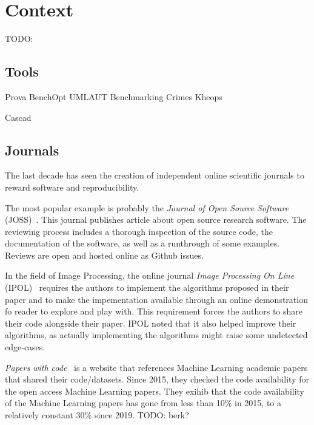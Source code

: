 \documentclass[sigconf,natbib=false]{acmart}
\newcommand{\todo}[1]{{\color{red}TODO: #1}}
\begin{document}
%
\section{Context}

\todo{}

\subsection{Tools}

Prova \cite{guerrera2019reproducible}
BenchOpt \cite{moreau2022benchopt}
UMLAUT \cite{umlaut}
Benchmarking Crimes \cite{van2018benchmarking}
Kheops \cite{rosendo2023kheops}

Cascad \cite{perignon2019certify}

\subsection{Journals}



The last decade has seen the creation of independent online scientific journals to reward software and reproducibility.

The most popular example is probably the \emph{Journal of Open Source Software} (JOSS)\ \cite{smith2018journal}.
This journal publishes article about open source research software.
The reviewing process includes a thorough inspection of the source code, the documentation of the software, as well as a runthrough of some examples.
Reviews are open and hosted online as Github issues.

In the field of Image Processing, the online journal \emph{Image Processing On Line} (IPOL)\ \cite{colom2015ipol} requires the authors to implement the algorithms proposed in their paper and to make the impementation available through an online demonstration fo reader to explore and play with.
This requirement forces the authors to share their code alongside their paper.
IPOL noted that it also helped improve their algorithms, as actually implementing the algorithms might raise some undetected edge-cases.

\emph{Papers with code}\ \cite{paperswithcode} is a website that references Machine Learning academic papers that shared their code/datasets.
Since 2015, they checked the code availability for the open access Machine Learning papers.
They exihib that the code availability of the Machine Learning papers has gone from less than 10\% in 2015, to a relatively constant 30\% since 2019.
\todo{berk?}
\end{document}
